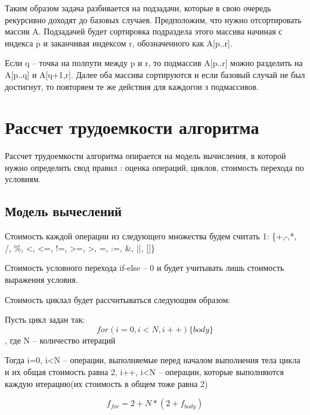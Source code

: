 Таким образом задача разбивается на подзадачи, которые в свою очередь рекурсивно доходят до базовых случаев. Предположим, что нужно отсортировать массив A. Подзадачей будет сортировка подраздела этого массива начиная с индекса p и заканчивая индексом r, обозначенного как A[p..r].

Если q -- точка на полпути между p и r, то подмассив A[p..r] можно разделить на A[p..q] и A[q+1,r]. Далее оба массива сортируются и если базовый случай не был достигнут, то повторяем те же действия для каждогои з подмассивов.

\section{ Рассчет трудоемкости алгоритма}

Рассчет трудоемкости алгоритма опирается на модель вычисления, в которой нужно определить свод правил : оценка операций, циклов, стоимость перехода по условиям.

\subsection{Модель вычеслений}

Стоимость каждой операции из следующего множества будем считать 1:
\{+,-,*, /, \%, <, <=, !=, >=, >, =, :=, \&, ||, []\}

Стоимость условного перехода if-else -- 0 и будет учитывать лишь стоимость выражения условия.

Стоимость циклал будет рассчитываться следующим образом:

Пусть цикл задан так:
\begin{equation}
        for(i=0, i<N, i++) \{ body \}
\end{equation}
, где N -- количество итераций

Тогда
i=0, i<N -- операции, выполняемые перед началом выполнения тела цикла и их общая стоимость равна 2, 
i++, i<N -- операции, которые выполняются каждую итерацию(их стоимость в общем тоже равна 2)

\begin{equation}
    f_{for} = 2 + N*(2 + f_{body})
\end{equation}

